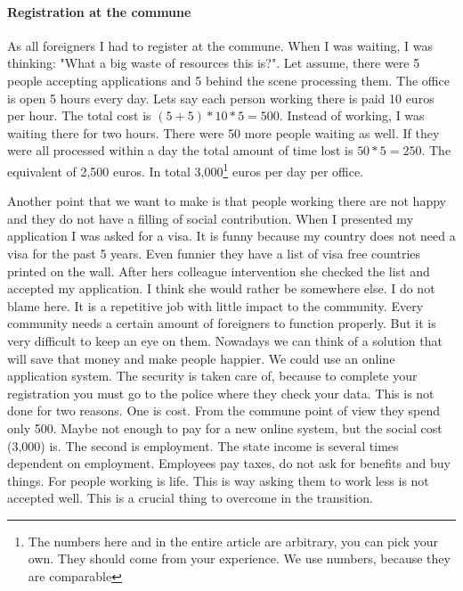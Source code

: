\documentclass{article}
\begin{document}
\paragraph{Registration at the commune}
As all foreigners I had to register at the commune.
When I was waiting, I was thinking: "What a big waste of resources this is?".
Let assume, there were 5 people accepting applications and 5 behind the scene processing them.
The office is open 5 hours every day.
Lets say each person working there is paid 10 euros per hour.
The total cost is $(5+5)*10*5=500$.
Instead of working, I was waiting there for two hours.
There were 50 more people waiting as well.
If they were all processed within a day the total amount of time lost is $50*5=250$.
The equivalent of 2,500 euros.
In total 3,000\footnote{The numbers here and in the entire article are arbitrary, you can pick your own. They should come from your experience. We use numbers, because they are comparable} euros per day per office.

Another point that we want to make is that people working there are not happy and they do not have a filling of social contribution.
When I presented my application I was asked for a visa.
It is funny because my country does not need a visa for the past 5 years.
Even funnier they have a list of visa free countries printed on the wall.
After hers colleague intervention she checked the list and accepted my application.
I think she would rather be somewhere else.
I do not blame here.
It is a repetitive job with little impact to the community.
Every community needs a certain amount of foreigners to function properly.
But it is very difficult to keep an eye on them.
Nowadays we can think of a solution that will save that money and make people happier.
We could use an online application system.
The security is taken care of, because to complete your registration you must go to the police where they check your data.
This is not done for two reasons.
One is cost.
From the commune point of view they spend only 500.
Maybe not enough to pay for a new online system, but the social cost (3,000) is.
The second is employment.
The state income is several times dependent on employment.
Employees pay taxes, do not ask for benefits and buy things.
For people working is life.
This is way asking them to work less is not accepted well.
This is a crucial thing to overcome in the transition.
\end{document}
